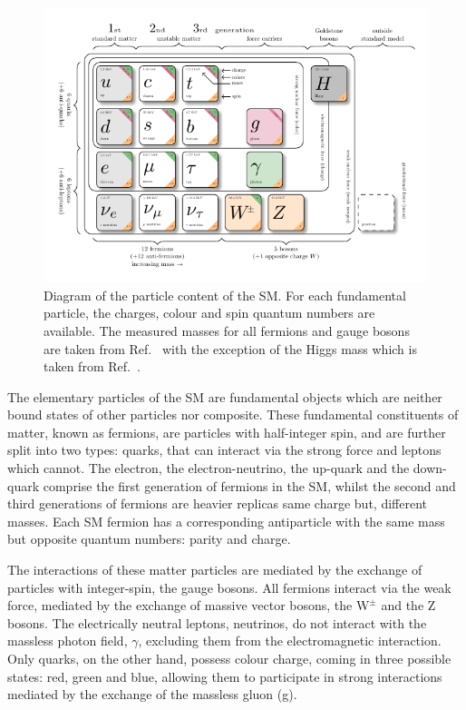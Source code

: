 \begin{figure}[h]
\centering
\includegraphics[width= 1\textwidth]{Figures/Introduction/Particles.pdf}
\caption{Diagram of the particle content of the SM. For each fundamental particle, the charges, colour and spin quantum numbers are available. The measured masses for all fermions and gauge bosons are taken from Ref.~\cite{ParticleMasses} with the exception of the Higgs mass which is taken from Ref.~\cite{Higgs_Mass}.}
\label{Figure:Introduction_1}
\end{figure}

The elementary particles of the SM are fundamental objects which are neither bound states of other particles nor composite. These fundamental constituents of matter, known as fermions, are particles with half-integer spin, and are further split into two types: quarks, that can interact via the strong force and leptons which cannot.  The electron, the electron-neutrino, the up-quark and the down-quark comprise the first generation of fermions in the SM, whilst the second and third generations of fermions are heavier replicas \ie same charge but, different masses. Each SM fermion has a corresponding antiparticle with the same mass but opposite quantum numbers: parity and charge.

The interactions of these matter particles are mediated by the exchange of particles with integer-spin, the gauge bosons. All fermions interact via the weak force, mediated by the exchange of massive vector bosons, the $\text{W}^\pm$ and the Z bosons. The electrically neutral leptons, neutrinos, do not interact with the massless photon field, $\gamma$, excluding them from the electromagnetic interaction. Only quarks, on the other hand, possess colour charge, coming in three possible states: red, green and blue, allowing them to participate in strong interactions mediated by the exchange of the massless gluon (g). 

